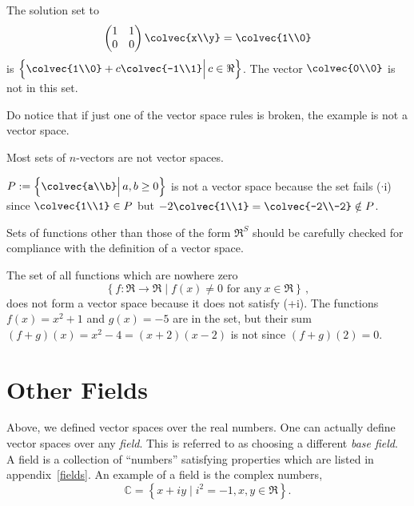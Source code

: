 \begin{example} 
The solution set to 
\[  \begin{pmatrix}
      1 & 1 \\
      0 & 0 
    \end{pmatrix} \colvec{x\\y} = \colvec{1\\0} \]
is  $\left\{ \colvec{1\\0} + c \colvec{-1\\1} \Big|\, c \in \Re \right\}$.
The vector $\colvec{0\\0}$ is not in this set.
\end{example}
Do notice that if just one of the vector space rules is broken, the example is not a vector space.

Most sets of $n$-vectors are not vector spaces. 
\begin{example} 
$P:=\left \{ \colvec{a\\b} \Big| \,a,b \geq 0 \right\}$ is not a vector space because the set fails ($\cdot$i) since 
$\colvec{1\\1}\in P$ but $-2\colvec{1\\1} =\colvec{-2\\-2} \notin P$.
\end{example}


Sets of functions other than those of the form $\Re^S$ should be carefully checked for compliance with the definition of a vector space.


\begin{example}
The set of all functions which are nowhere zero 
\[\left\{ f \colon \Re\rightarrow \Re \mid f(x)\neq 0 \text{~for~any}~x\in\Re \right\}\, ,\]
does not form a vector space because it does not satisfy (+i). The functions $f(x)=x^2+1$ and $g(x)= -5$ are in the set, but their sum $(f+g)(x)=x^2-4=(x+2)(x-2)$ is not since $(f+g)(2)=0$.
\end{example}


\section{Other Fields} \label{otherfields}
Above, we defined vector spaces over the real numbers.  One can actually define vector spaces over any \emph{field}.
This is referred to as choosing a different {\itshape base field}.
  A field is a collection of ``numbers'' satisfying  properties which are listed in appendix~\ref{fields}.
An example of a field is the complex numbers, 
\[
\mathbb{C}= \left\{x+iy \mid i^2=-1, x,y\in \Re \right\}.
\]

